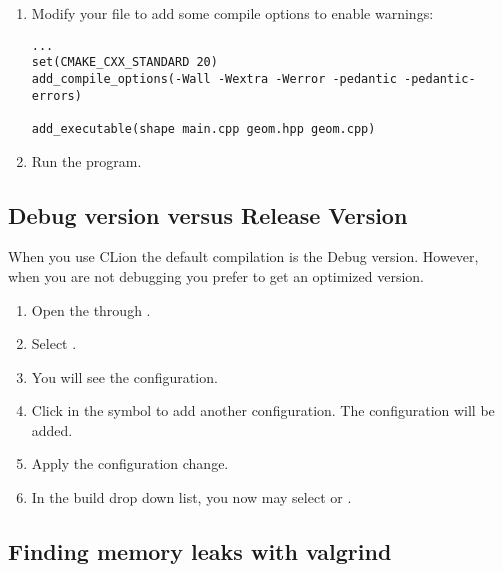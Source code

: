 \begin{enumerate}
\item
Modify your  file to add some compile options to enable warnings:

\begin{lstlisting}
...
set(CMAKE_CXX_STANDARD 20)
add_compile_options(-Wall -Wextra -Werror -pedantic -pedantic-errors)

add_executable(shape main.cpp geom.hpp geom.cpp)
\end{lstlisting}

\item
Run the program.

\end{enumerate}

\subsection{Debug version versus Release Version}

When you use CLion the default compilation is the Debug version.
However, when you are not debugging you prefer to get an optimized  version.

\begin{enumerate}

\item
Open the  through .

\item
Select .

\item 
You will see the  configuration.

\item 
Click in the \textmark{+} symbol to add another configuration. The  configuration
will be added.

\item
Apply the configuration change.

\item
In the build drop down list, you now may select  or .

\end{enumerate}

\subsection{Finding memory leaks with valgrind}

